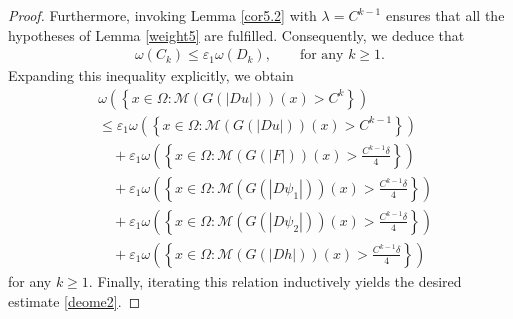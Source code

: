 \documentclass[10pt,a4paper]{article}
\theoremstyle{definition}
\numberwithin{equation}{section}
\begin{document}
\begin{proof}
 	
 	Furthermore, invoking Lemma \ref{cor5.2} with $\lambda=C^{k-1}$ ensures that all the hypotheses of Lemma \ref{weight5} are fulfilled. Consequently, we deduce that
 	\begin{align*}
 		\omega(C_k)
 		\leq
 		\varepsilon_1\omega(D_k),
 		\qquad
 		\text{for any }k\geq1 .
 	\end{align*}
Expanding this inequality explicitly, we obtain
 	\begin{align*}
 		&\omega
 		\left(
 		\left\{
 		x\in\Omega:
 		\mathcal{M}(G(|Du|))(x)>C^k
 		\right\}
 		\right)
 		\nonumber\\
 		&\leq
 		\varepsilon_1
 		\omega
 		\left(
 		\left\{
 		x\in\Omega:
 		\mathcal{M}(G(|Du|))(x)>C^{k-1}
 		\right\}
 		\right)
 		\nonumber\\
 		&\quad+
 		\varepsilon_1
 		\omega
 		\left(
 		\left\{
 		x\in\Omega:
 		\mathcal{M}(G(|F|))(x)>\frac{C^{k-1}\delta}{4}
 		\right\}
 		\right)
 		\nonumber\\
 		&\quad+
 		\varepsilon_1
 		\omega
 		\left(
 		\left\{
 		x\in\Omega:
 		\mathcal{M}(G(|D\psi_1|))(x)>\frac{C^{k-1}\delta}{4}
 		\right\}
 		\right)
 		\nonumber\\
 		&\quad+
 		\varepsilon_1
 		\omega
 		\left(
 		\left\{
 		x\in\Omega:
 		\mathcal{M}(G(|D\psi_2|))(x)>\frac{C^{k-1}\delta}{4}
 		\right\}
 		\right)
 		\nonumber\\
 		&\quad+
 		\varepsilon_1
 		\omega
 		\left(
 		\left\{
 		x\in\Omega:
 		\mathcal{M}(G(|Dh|))(x)>\frac{C^{k-1}\delta}{4}
 		\right\}
 		\right)
 	\end{align*}
for any $k\geq1$. Finally, iterating this relation inductively yields the desired estimate \eqref{deome2}.
 \end{proof}
\end{document}
